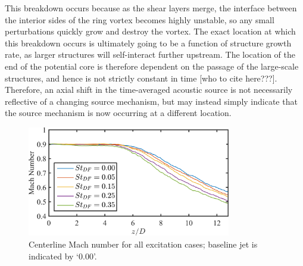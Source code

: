 This breakdown occurs because as the shear layers merge, the interface between the interior sides of the ring vortex becomes highly unstable, so any small perturbations quickly grow and destroy the vortex.
The exact location at which this breakdown occurs is ultimately going to be a function of structure growth rate, as larger structures will self-interact further upstream.
The location of the end of the potential core is therefore dependent on the passage of the large-scale structures, and hence is not strictly constant in time [who to cite here???].
Therefore, an axial shift in the time-averaged acoustic source is not necessarily reflective of a changing source mechanism, but may instead simply indicate that the source mechanism is now occurring at a different location.
\begin{figure}
	\centering
	\includegraphics[width = 3.5in]{Figures/ch4_centerlineMach.png}
	\caption{Centerline Mach number for all excitation cases; baseline jet is indicated by `0.00'.}
	\label{fig:ch4_centerlinemach}
\end{figure}